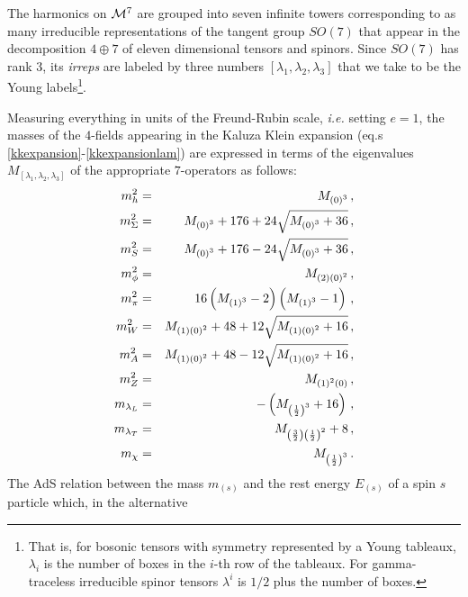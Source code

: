 \documentclass[a4paper,11pt]{article}
\begin{document}
The harmonics on ${\cal M}^7$ are  grouped into seven infinite
towers corresponding to as many irreducible representations of the
tangent group $SO(7)$ that appear in the decomposition $4\oplus 7$
of eleven dimensional tensors and spinors. Since $SO(7)$ has rank
3, its {\sl irreps} are labeled by three numbers $[\lambda _1
,\lambda _2 ,\lambda _3]$ that we take to be the Young
labels\footnote{ That is, for bosonic tensors with symmetry
represented by a Young tableaux, $\lambda_i$ is the number of
boxes in the $i$-th row of the tableaux. For gamma-traceless
irreducible spinor tensors $\lambda^i$ is $1/2$ plus the number of
boxes.}.
\par
Measuring everything in units of the Freund-Rubin scale,
\emph{i.e.} setting $e=1$, the masses of the $4$-fields appearing
in the Kaluza Klein expansion (eq.s
\ref{kkexpansion}-\ref{kkexpansionlam}) are expressed in terms of
the eigenvalues $M_{[\lambda _1 ,\lambda _2 ,\lambda _3]}$ of the
appropriate $7$-operators as follows:
\begin{eqnarray}
m_h^2 & = & M_{\left(0\right)^3}\,, \label{gmassh} \\
m_{\Sigma}^2&=& M_{\left(0\right)^3} +176+24\sqrt{
M_{\left(0\right)^3}+36}\,, \label{gmassigma}\\ m_S^2 &=&
M_{\left(0\right)^3} +176-24\sqrt{
M_{\left(0\right)^3}+36}\,,\label{gmassesse}\\ m_{\phi}^2 &=&
M_{\left(2\right)\left(0\right)^2} \,,\label{gmassfi}\\ m_{\pi}^2
&=& 16\left( M_{\left(1\right)^3}-2\right)\left(
M_{\left(1\right)^3}-1\right) \,,\label{gmasspi}\\ m_W^2 &=&
M_{\left(1\right)\left(0\right)^2} + 48 + 12
\sqrt{M_{\left(1\right)\left(0\right)^2}+16}\,,\label{gmassW}\\
m_A^2 &=& M_{\left(1\right)\left(0\right)^2} + 48 - 12
\sqrt{M_{\left(1\right)\left(0\right)^2}+16}\,,\label{gmassA}\\
m_Z^2 & = & M_{\left(1\right)^2\left(0\right)} \,,\label{gmassZ}\\
m_{\lambda_L} & = & -\left( M_{\left(1\over 2\right)^3}
+16\right)\,, \label{gmasslamL}\\ m_{\lambda_T} & = &
M_{\left(3\over 2\right)\left(1\over
2\right)^2}+8\,,\label{gmasslamT}\\ m_{\chi} & = & M_{\left(1\over
2\right)^3}\,.\label{gmasschi}
\end{eqnarray}
The AdS relation between the mass $m_{(s)}$ and the rest energy
$E_{(s)}$ of a spin $s$ particle which, in the alternative
\end{document}
